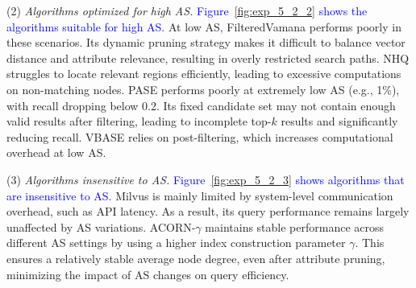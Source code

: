 \documentclass[sigconf, nonacm]{acmart}
\begin{document}
{	\par
	(2) \textit{Algorithms optimized for high AS.}  
	\textcolor{blue}{Figure~\ref{fig:exp_5_2_2} shows the algorithms suitable for high AS.}
	At low AS, FilteredVamana performs poorly in these scenarios. Its dynamic pruning strategy makes it difficult to balance vector distance and attribute relevance, resulting in overly restricted search paths. NHQ struggles to locate relevant regions efficiently, leading to excessive computations on non-matching nodes. 
	 PASE performs poorly at extremely low AS (e.g., 1\%), with recall dropping below 0.2. Its fixed candidate set may not contain enough valid results after filtering, leading to incomplete top-$k$ results and significantly reducing recall. VBASE relies on post-filtering, which increases computational overhead at low AS.
	
	\par
	(3) \textit{Algorithms insensitive to AS.}  
	\textcolor{blue}{Figure~\ref{fig:exp_5_2_3} shows algorithms that are insensitive to AS.}
	Milvus is mainly limited by system-level communication overhead, such as API latency. As a result, its query performance remains largely unaffected by AS variations. ACORN-\(\gamma\) maintains stable performance across different AS settings by using a higher index construction parameter $\gamma$. This ensures a relatively stable average node degree, even after attribute pruning, minimizing the impact of AS changes on query efficiency.
	
	
	
		
}
\end{document}
